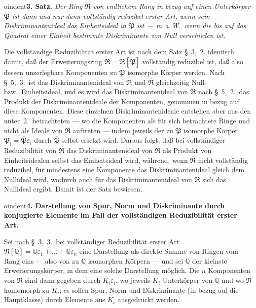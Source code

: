 \documentclass[12pt,a4paper]{article}
\newcommand{\mf}[1]{\mathfrak{#1}}     %
\newcommand{\PP}{\mathfrak{P}}          %
\newcommand{\QQ}{\mathbb{Q}}            %
\theoremstyle{definition}
\begin{document}
\medskip



oindent\textbf{3. Satz.} \textit{Der Ring $\mf{R}$ von endlichem Rang in
bezug auf einen Unterk\"orper $\PP$ ist dann und nur dann vollst\"andig
reduzibel erster Art, wenn sein Diskriminantenideal das Einheitsideal in
$\PP$ ist --- m.\,a.\,W.\ wenn die bis auf das Quadrat einer Einheit
bestimmte Diskriminante von Null verschieden ist.}

Die vollst\"andige Reduzibilit\"at erster Art ist nach dem Satz \S~3,~2. identisch damit, da\ss{} der Erweiterungsring $\overline{\mf{R}} =
\mf{R}[\overline{\PP}]$ vollst\"andig reduzibel ist, da\ss{} also dessen
unzerlegbare Komponenten zu $\overline{\PP}$ isomorphe K\"orper werden.
Nach \S~5,~3.\ ist das Diskriminantenideal von $\mf{R}$ und
$\overline{\mf{R}}$ gleichzeitig Null- bzw.\ Einheitsideal, und es wird das
Diskriminantenideal von $\overline{\mf{R}}$ nach \S~5,~2.\ das Produkt der
Diskriminantenideale der Komponenten, genommen in bezug auf diese
Komponenten. Diese einzelnen Diskriminantenideale entstehen aber aus den
unter~2.\ betrachteten --- wo die Komponenten als f\"ur sich betrachtete
Ringe und nicht als Ideale von $\overline{\mf{R}}$ auftreten --- indem
jeweils der zu $\overline{\PP}$ isomorphe K\"orper $\PP_i =
\overline{\PP}\varepsilon_i$ durch $\overline{\PP}$ selbst ersetzt wird.
Daraus folgt, da\ss{} bei vollst\"andiger Reduzibilit\"at von
$\overline{\mf{R}}$ das Diskriminantenideal von $\mf{R}$ als Produkt von
Einheitsidealen selbst das Einheitsideal wird, w\"ahrend, wenn
$\overline{\mf{R}}$ nicht vollst\"andig reduzibel, f\"ur mindestens eine
Komponente das Diskriminantenideal gleich dem Nullideal wird, wodurch auch
f\"ur das Diskriminantenideal von $\mf{R}$ sich das Nullideal ergibt. Damit
ist der Satz bewiesen.

\medskip



oindent\textbf{4. Darstellung von Spur, Norm und Diskriminante durch
konjugierte Elemente im Fall der vollst\"andigen Reduzibilit\"at erster Art.}

Sei nach \S~3,~3.\ bei vollst\"andiger Reduzibilit\"at erster Art
$\mf{R}[\QQ] = \QQ\varepsilon_1 + \dots + \QQ\varepsilon_n$ eine
Darstellung als direkte Summe von Ringen vom Rang eins --- also von zu
$\QQ$ isomorphen K\"orpern --- und sei $\QQ$ der kleinste Erweiterungsk\"orper,
in dem eine solche Darstellung m\"oglich. Die $n$ Komponenten von
$\mf{R}$ sind dann gegeben durch $K_i\varepsilon_i$, wo jeweils $K_i$
Unterk\"orper von $\QQ$ und wo $\mf{R}$ homomorph zu $K_i$; es sollen Spur,
Norm und Diskriminante (in bezug auf die Hauptklasse) durch Elemente aus
$K_i$ ausgedr\"uckt werden.
\end{document}
